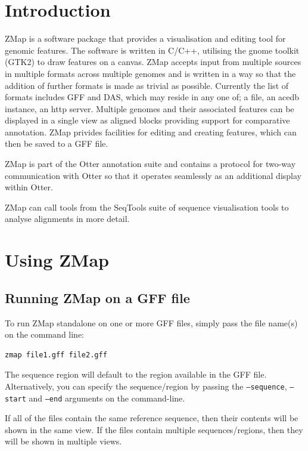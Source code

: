 \documentclass[letterpaper]{article}
\begin{document}
\clearpage\tableofcontents

\clearpage
\section{Introduction}

ZMap is a software package that provides a visualisation and editing tool for genomic features. The software is written in C/C++, utilising the gnome toolkit (GTK2) to draw features on a canvas. ZMap accepts input from multiple sources in multiple formats across multiple genomes and is written in a way so that the addition of further formats is made as trivial as possible. Currently the list of formats includes GFF and DAS, which may reside in any one of; a file, an acedb instance, an http server. Multiple genomes and their associated features can be displayed in a single view as aligned blocks providing support for comparative annotation. ZMap privides facilities for editing and creating features, which can then be saved to a GFF file.

ZMap is part of the Otter annotation suite and contains a protocol for two-way communication with Otter so that it operates seamlessly as an additional display within Otter.

ZMap can call tools from the SeqTools suite of sequence visualisation tools to analyse alignments in more detail.

\section{Using ZMap}
\subsection{Running ZMap on a GFF file}
To run ZMap standalone on one or more GFF files, simply pass the file name(s) on the command line:
\begin{verbatim}
zmap file1.gff file2.gff
\end{verbatim}

The sequence region will default to the region available in the GFF file. Alternatively, you can specify the sequence/region by passing the \texttt{--sequence}, \texttt{--start} and \texttt{--end} arguments on the command-line.

If all of the files contain the same reference sequence, then their contents will be shown in the same view. If the files contain multiple sequences/regions, then they will be shown in multiple views.
\end{document}
